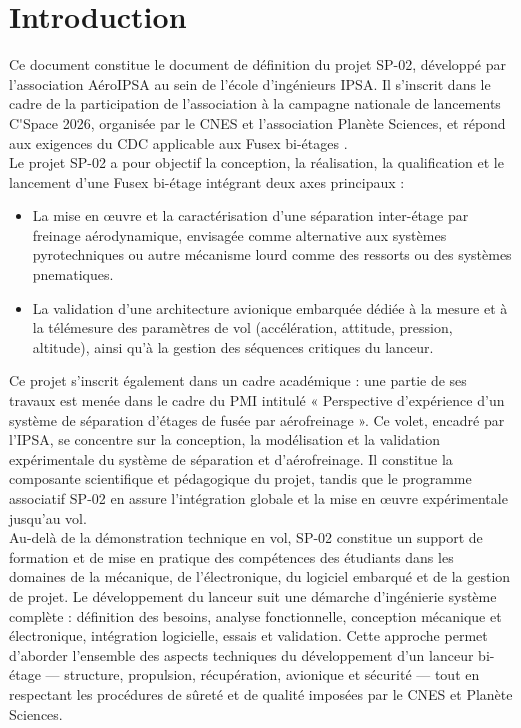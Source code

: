 \section*{Introduction}
\label{sec:introduction}

Ce document constitue le document de définition du projet SP-02, développé par l’association AéroIPSA au sein de l’école
d’ingénieurs \acrshort{IPSA}. Il s’inscrit dans le cadre de la participation de l’association à la campagne nationale de
lancements \gls{C'Space} 2026, organisée par le \acrfull{CNES} et l’association \gls{Planète Sciences}, et répond aux exigences
du \acrfull{CDC} applicable aux \gls{Fusex} bi-étages \cite{CDC_BiEtage}.\\

Le projet SP-02 a pour objectif la conception, la réalisation, la qualification et le lancement d’une \gls{Fusex} bi-étage
intégrant deux axes principaux :
\begin{itemize}
    \item La mise en œuvre et la caractérisation d’une séparation inter-étage par freinage aérodynamique, envisagée comme
    alternative aux systèmes pyrotechniques ou autre mécanisme lourd comme des ressorts ou des systèmes pnematiques.
    \item La validation d’une architecture avionique embarquée dédiée à la mesure et à la télémesure des paramètres de vol
    (accélération, attitude, pression, altitude), ainsi qu’à la gestion des séquences critiques du lanceur.\\
\end{itemize}

Ce projet s’inscrit également dans un cadre académique : une partie de ses travaux est menée dans le cadre du \acrfull{PMI}
intitulé « Perspective d’expérience d’un système de séparation d’étages de fusée par aérofreinage ». Ce volet, encadré par
l'\acrshort{IPSA}, se concentre sur la conception, la modélisation et la validation expérimentale du système de séparation et
d’aérofreinage. Il constitue la composante scientifique et pédagogique du projet, tandis que le programme associatif SP-02 en
assure l’intégration globale et la mise en œuvre expérimentale jusqu’au vol.\\

Au-delà de la démonstration technique en vol, SP-02 constitue un support de formation et de mise en pratique des compétences des
étudiants dans les domaines de la mécanique, de l’électronique, du logiciel embarqué et de la gestion de projet. Le développement
du lanceur suit une démarche d’ingénierie système complète : définition des besoins, analyse fonctionnelle, conception mécanique
et électronique, intégration logicielle, essais et validation. Cette approche permet d’aborder l’ensemble des aspects techniques
du développement d’un lanceur bi-étage — structure, propulsion, récupération, avionique et sécurité — tout en respectant les
procédures de sûreté et de qualité imposées par le \acrshort{CNES} et \gls{Planète Sciences}.\\

